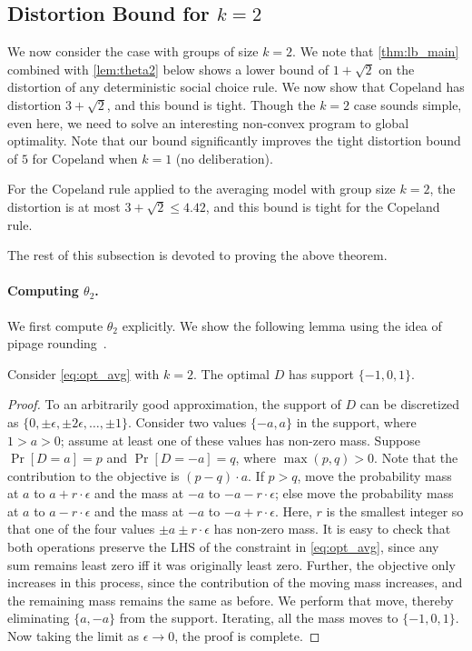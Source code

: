 \subsection{Distortion Bound for $k=2$}
\label{sec:two}
We now consider the case with groups of size $k=2$. We note that \cref{thm:lb_main} combined with \cref{lem:theta2} below shows a lower bound of $1+\sqrt{2}$ on the distortion of any deterministic social choice rule. We now show that Copeland has distortion $3+\sqrt{2}$, and this bound is tight. Though the $k=2$ case  sounds simple, even here, we need to solve an interesting non-convex program to global optimality. Note that our bound significantly improves the tight distortion bound of $5$ for Copeland when $k = 1$ (no deliberation).

\begin{theorem}
\label{thm:theta2}
For the Copeland rule applied to the averaging model with group size $k = 2$, the distortion is at most $3 + \sqrt{2} \le 4.42$, and this bound is tight for the Copeland rule.
\end{theorem}

The rest of this subsection is devoted to proving the above theorem. 

\paragraph{Computing $\theta_2$.} We first compute $\theta_2$ explicitly. We show the following lemma using the idea of pipage rounding~\cite{Ageev2004}.

\begin{lemma}
\label{lem:pipage}
    Consider \cref{eq:opt_avg} with $k = 2$. The optimal $D$ has support $\{-1,0,1\}$.
\end{lemma}
\begin{proof}
 To an arbitrarily good approximation, the support of $D$ can be discretized as $\{0, \pm \epsilon, \pm 2 \epsilon, \ldots, \pm 1\}$. Consider two values $\{-a,a\}$ in the support, where $1 > a > 0$; assume at least one of these values has non-zero mass.  Suppose $\Pr[D = a] = p$ and $\Pr[D = -a] = q$, where $\max(p,q) > 0$. Note that the contribution to the objective is $(p - q) \cdot a$. If $p > q$,  move the probability mass at $a$ to $a + r \cdot \epsilon$ and the mass at $-a$ to $-a - r \cdot \epsilon$; else move the probability mass at $a$ to $a - r \cdot \epsilon$ and the mass at $-a$ to $-a + r \cdot \epsilon$. Here, $r$ is the smallest integer so that one of the four values $\pm a \pm r \cdot \epsilon$ has non-zero mass. It is easy to check that both operations preserve the LHS of the constraint in \cref{eq:opt_avg}, since any sum remains least zero iff it was originally least zero. Further, the objective only increases in this process, since the contribution of the moving mass increases, and the remaining mass remains the same as before. We perform that move, thereby eliminating $\{a,-a\}$ from the support. Iterating, all the mass moves to $\{-1, 0, 1\}$. Now taking the limit as $\epsilon \rightarrow 0$, the proof is complete. 
\end{proof}

